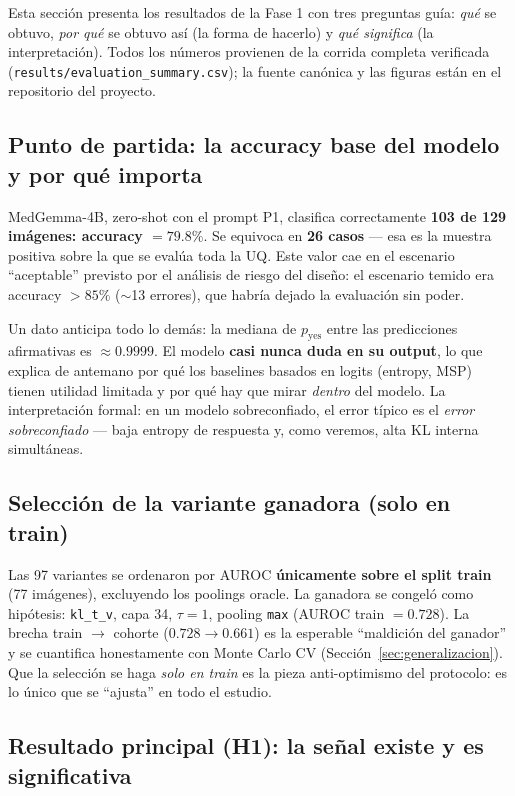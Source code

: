 \documentclass[12pt,a4paper]{article}
\begin{document}
Esta sección presenta los resultados de la Fase 1 con tres preguntas
guía: \emph{qué} se obtuvo, \emph{por qué} se obtuvo así (la forma de
hacerlo) y \emph{qué significa} (la interpretación). Todos los números
provienen de la corrida completa verificada
(\texttt{results/evaluation\_summary.csv}); la fuente canónica y las
figuras están en el repositorio del proyecto.

\subsection{Punto de partida: la accuracy base del modelo y por qué importa}

MedGemma-4B, zero-shot con el prompt P1, clasifica correctamente
\textbf{103 de 129 imágenes: accuracy $= 79.8\%$}. Se equivoca en
\textbf{26 casos} --- esa es la muestra positiva sobre la que se evalúa
toda la UQ. Este valor cae en el escenario ``aceptable'' previsto por el
análisis de riesgo del diseño: el escenario temido era accuracy $> 85\%$
($\sim$13 errores), que habría dejado la evaluación sin poder.

Un dato anticipa todo lo demás: la mediana de $p_{\mathrm{yes}}$ entre
las predicciones afirmativas es $\approx 0.9999$. El modelo \textbf{casi
nunca duda en su output}, lo que explica de antemano por qué los baselines
basados en logits (entropy, MSP) tienen utilidad limitada y por qué hay
que mirar \emph{dentro} del modelo. La interpretación formal: en un modelo
sobreconfiado, el error típico es el \emph{error sobreconfiado} --- baja
entropy de respuesta y, como veremos, alta KL interna simultáneas.

\subsection{Selección de la variante ganadora (solo en train)}
\label{sec:ganadora}

Las 97 variantes se ordenaron por AUROC \textbf{únicamente sobre el split
train} (77 imágenes), excluyendo los poolings oracle. La ganadora se
congeló como hipótesis: \texttt{kl\_t\_v}, capa 34, $\tau = 1$, pooling
\texttt{max} (AUROC train $= 0.728$). La brecha train $\to$ cohorte
($0.728 \to 0.661$) es la esperable ``maldición del ganador'' y se
cuantifica honestamente con Monte Carlo CV (Sección~\ref{sec:generalizacion}).
Que la selección se haga \emph{solo en train} es la pieza anti-optimismo
del protocolo: es lo único que se ``ajusta'' en todo el estudio.

\subsection{Resultado principal (H1): la señal existe y es significativa}
\label{sec:h1}
\end{document}
